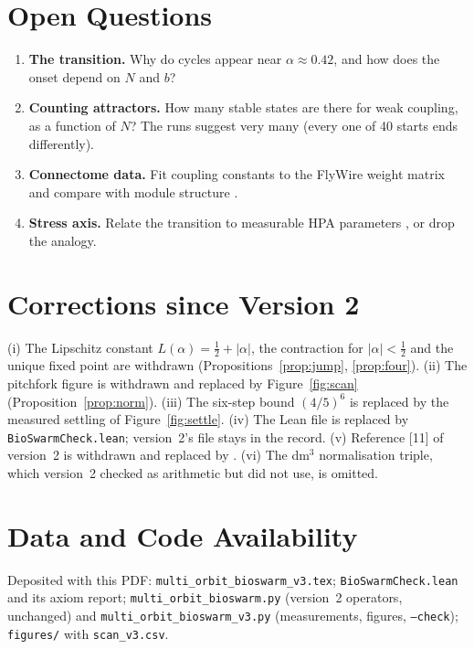 \documentclass[11pt,a4paper]{article}
\theoremstyle{definition}
\theoremstyle{remark}
\begin{document}
\section{Open Questions}
\begin{enumerate}[leftmargin=2em,itemsep=2pt]
\item \textbf{The transition.} Why do cycles appear near $\alpha\approx0.42$, and how does the onset depend on $N$ and $b$?
\item \textbf{Counting attractors.} How many stable states are there for weak coupling, as a function of $N$? The runs suggest
very many (every one of 40 starts ends differently).
\item \textbf{Connectome data.} Fit coupling constants to the FlyWire weight matrix \cite{Dorkenwald2024} and compare with
module structure \cite{Schlegel2024}.
\item \textbf{Stress axis.} Relate the transition to measurable HPA parameters \cite{Zarzer2013}, or drop the analogy.
\end{enumerate}

\section{Corrections since Version 2}
(i) The Lipschitz constant $L(\alpha)=\tfrac12+|\alpha|$, the contraction for $|\alpha|<\tfrac12$ and the unique fixed
point are withdrawn (Propositions~\ref{prop:jump}, \ref{prop:four}). (ii) The pitchfork figure is withdrawn and replaced
by Figure~\ref{fig:scan} (Proposition~\ref{prop:norm}). (iii) The six-step bound $(4/5)^6$ is replaced by the measured
settling of Figure~\ref{fig:settle}. (iv) The Lean file is replaced by \texttt{BioSwarmCheck.lean}; version~2's file
stays in the record. (v) Reference [11] of version~2 is withdrawn and replaced by \cite{Zarzer2013}. (vi) The
dm$^3$ normalisation triple, which version~2 checked as arithmetic but did not use, is omitted.

\section*{Data and Code Availability}
Deposited with this PDF: \texttt{multi\_orbit\_bioswarm\_v3.tex}; \texttt{BioSwarmCheck.lean} and its axiom report;
\texttt{multi\_orbit\_bioswarm.py} (version~2 operators, unchanged) and \texttt{multi\_orbit\_bioswarm\_v3.py}
(measurements, figures, \texttt{--check}); \texttt{figures/} with \texttt{scan\_v3.csv}.
\end{document}

